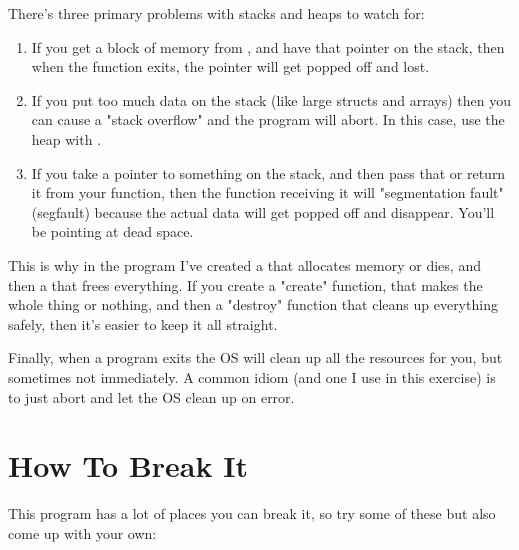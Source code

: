 There's three primary problems with stacks and heaps to watch for:

\begin{enumerate}
\item If you get a block of memory from , and have that
    pointer on the stack, then when the function exits, the pointer will
    get popped off and lost.
\item If you put too much data on the stack (like large structs and arrays)
    then you can cause a "stack overflow" and the program will abort.  In
    this case, use the heap with .
\item If you take a pointer to something on the stack, and then pass that
    or return it from your function, then the function receiving it will
    "segmentation fault" (segfault) because the actual data will get 
    popped off and disappear.  You'll be pointing at dead space.
\end{enumerate}

This is why in the program I've created a  that allocates
memory or dies, and then a  that frees everything.  If you
create a "create" function, that makes the whole thing or nothing, and then a
"destroy" function that cleans up everything safely, then it's easier to keep 
it all straight.

Finally, when a program exits the OS will clean up all the resources for you,
but sometimes not immediately.  A common idiom (and one I use in this
exercise) is to just abort and let the OS clean up on error.

\section{How To Break It}

This program has a lot of places you can break it, so try some of these
but also come up with your own:

